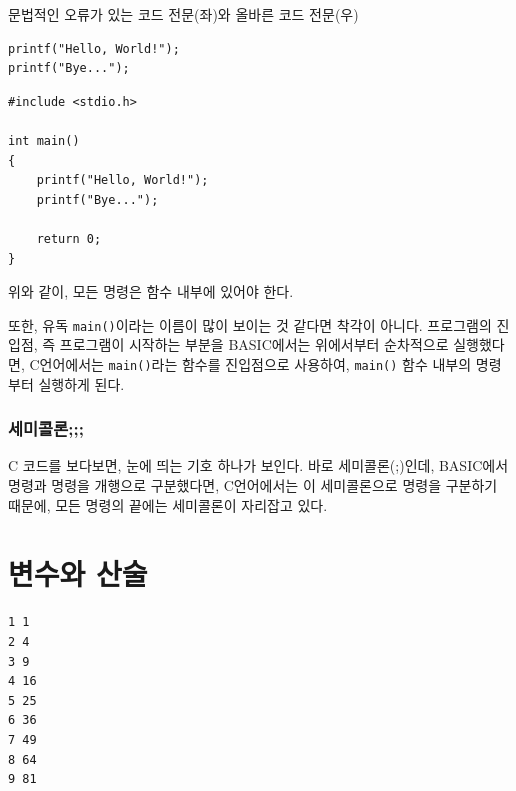 \documentclass[a4paper,12pt]{book}
\newcommand{\V}[1]{\Verb|#1|}
\begin{document}
\begin{center}

    \centering
    
    문법적인 오류가 있는 코드 전문(좌)와 올바른 코드 전문(우)

    \begin{minipage}{0.45\textwidth}
        \begin{lstlisting}
printf("Hello, World!");
printf("Bye...");
        \end{lstlisting}
    \end{minipage}
    \hfill
    \begin{minipage}{0.45\textwidth}
        \begin{lstlisting}
#include <stdio.h>

int main()
{
    printf("Hello, World!");
    printf("Bye...");

    return 0;
}
        \end{lstlisting}
    \end{minipage}

\end{center}

위와 같이, 모든 명령은 함수 내부에 있어야 한다.

또한, 유독 \V{main()}이라는 이름이 많이 보이는 것 같다면 착각이 아니다.
프로그램의 진입점, 즉 프로그램이 시작하는 부분을 BASIC에서는 위에서부터
순차적으로 실행했다면, C언어에서는 \V{main()}라는 함수를 진입점으로 사용하여,
\V{main()} 함수 내부의 명령부터 실행하게 된다.


\subsubsection{세미콜론;;;}

C 코드를 보다보면, 눈에 띄는 기호 하나가 보인다.
바로 세미콜론(;)인데, BASIC에서 명령과 명령을 개행으로 구분했다면,
C언어에서는 이 세미콜론으로 명령을 구분하기 때문에,
모든 명령의 끝에는 세미콜론이 자리잡고 있다.


\section{변수와 산술}

\begin{lstlisting}
1 1
2 4
3 9
4 16
5 25
6 36
7 49
8 64
9 81
\end{lstlisting}
\end{document}
